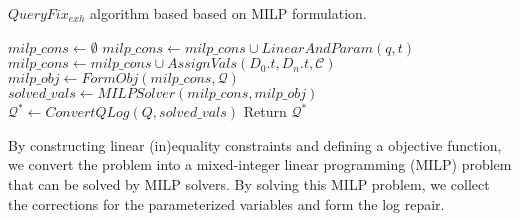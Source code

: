 \begin{algorithm}[htbp]
\caption{$QueryFix_{exh}$ algorithm based based on MILP formulation.}
\label{alg:basic}
\begin{algorithmic}
\STATE $milp\_cons \leftarrow \emptyset$
\STATE $milp\_cons \leftarrow milp\_cons \cup LinearAndParam(q, t)$
\ENDFOR
\STATE $milp\_cons \leftarrow milp\_cons \cup AssignVals(D_0.t, D_n.t, \mathcal{C})$
\ENDFOR 
\STATE $milp\_obj \leftarrow FormObj (milp\_cons, \mathcal{Q})$
\STATE $solved\_vals \leftarrow MILPSolver(milp\_cons, milp\_obj)$
\STATE $\mathcal{Q}^* \leftarrow ConvertQLog(Q, solved\_vals)$
\STATE Return $\mathcal{Q}^*$
\end{algorithmic}
\end{algorithm}

By constructing linear (in)equality constraints and
defining a objective function, we convert the problem into
 a mixed-integer linear programming (MILP) problem that can be 
 solved by MILP solvers. By solving this MILP problem, we collect the
corrections for the parameterized variables and form the log repair. 

















